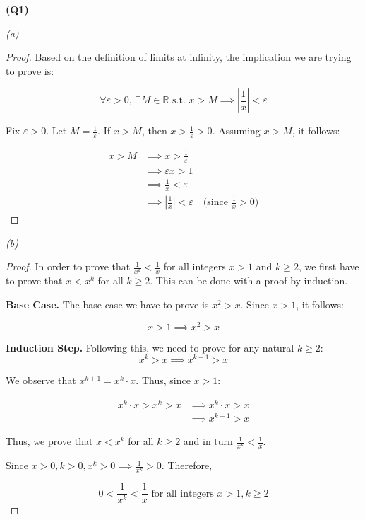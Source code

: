 \documentclass[12pt, a4paper]{article}
\renewcommand{\epsilon}{\varepsilon}
\newcommand{\R}{\mathbb{R}}
\newcommand{\st}{\text{ s.t. }}
\begin{document}
\textbf{(Q1)}

\textit{(a)}

\begin{proof}
    Based on the definition of limits at infinity, the implication we are trying to prove is:

    \[
        \forall \epsilon > 0,\: \exists M \in \R \st x > M \implies \left|\frac{1}{x}\right| < \epsilon
    \]

    Fix $\epsilon > 0$. Let $M = \tfrac{1}{\epsilon}$. If $x > M$, then $x > \tfrac{1}{\epsilon} > 0$.
    Assuming $x > M$, it follows:
    
    \begin{align*}
        x > M & \implies x > \frac{1}{\epsilon}\\
        & \implies \epsilon x > 1\\
        & \implies \frac{1}{x} < \epsilon\\
        & \implies \left|\frac{1}{x}\right| < \epsilon \quad \text{(since $\tfrac{1}{x} > 0$)}
    \end{align*}
\end{proof}

\textit{(b)}

\begin{proof} 
    In order to prove that $\tfrac{1}{x^k} < \tfrac{1}{x}$ for all integers $x > 1$ and $k \geq 2$,
    we first have to prove that $x < x^k$ for all $k \geq 2$. This can be done with a proof by induction.
    
    \textbf{Base Case.} The base case we have to prove is $x^2 > x$. Since $x > 1$, it follows:

    \[
        x > 1 \implies x^2 > x
    \]

    \textbf{Induction Step.} Following this, we need to prove for any natural $k \geq 2$:
    \[
        x^k > x \implies x^{k + 1} > x
    \]

    We observe that $x^{k+1} = x^k \cdot x$. Thus, since $x > 1$:
    
    \begin{align*}
        x^k \cdot x > x^k > x & \implies x^k \cdot x > x\\
        & \implies x^{k + 1} > x
    \end{align*}

    Thus, we prove that $x < x^k$ for all $k \geq 2$ and in turn $\tfrac{1}{x^k} < \tfrac{1}{x}$.
    
    Since $x > 0, k > 0, x^k > 0 \implies \tfrac{1}{x^k} > 0$. Therefore,

    \[
        0 < \frac{1}{x^k} < \frac{1}{x} \text{ for all integers $x > 1, k \geq 2$}
    \]

\end{proof}
\end{document}
